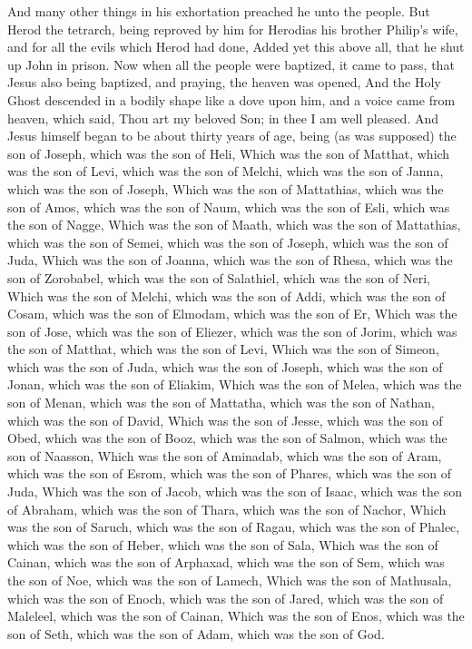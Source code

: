  And many other things in his exhortation preached he
unto the people.  But Herod the tetrarch, being reproved
by him for Herodias his brother Philip's wife, and for all the evils
which Herod had done,  Added yet this above all, that he
shut up John in prison.  Now when all the people were
baptized, it came to pass, that Jesus also being baptized, and praying,
the heaven was opened,  And the Holy Ghost descended in a
bodily shape like a dove upon him, and a voice came from heaven, which
said, Thou art my beloved Son; in thee I am well pleased.
 And Jesus himself began to be about thirty years of age,
being (as was supposed) the son of Joseph, which was the son of Heli,
 Which was the son of Matthat, which was the son of Levi,
which was the son of Melchi, which was the son of Janna, which was the
son of Joseph,  Which was the son of Mattathias, which
was the son of Amos, which was the son of Naum, which was the son of
Esli, which was the son of Nagge,  Which was the son of
Maath, which was the son of Mattathias, which was the son of Semei,
which was the son of Joseph, which was the son of Juda, 
Which was the son of Joanna, which was the son of Rhesa, which was the
son of Zorobabel, which was the son of Salathiel, which was the son of
Neri,  Which was the son of Melchi, which was the son of
Addi, which was the son of Cosam, which was the son of Elmodam, which
was the son of Er,  Which was the son of Jose, which was
the son of Eliezer, which was the son of Jorim, which was the son of
Matthat, which was the son of Levi,  Which was the son of
Simeon, which was the son of Juda, which was the son of Joseph, which
was the son of Jonan, which was the son of Eliakim, 
Which was the son of Melea, which was the son of Menan, which was the
son of Mattatha, which was the son of Nathan, which was the son of
David,  Which was the son of Jesse, which was the son of
Obed, which was the son of Booz, which was the son of Salmon, which was
the son of Naasson,  Which was the son of Aminadab, which
was the son of Aram, which was the son of Esrom, which was the son of
Phares, which was the son of Juda,  Which was the son of
Jacob, which was the son of Isaac, which was the son of Abraham, which
was the son of Thara, which was the son of Nachor,  Which
was the son of Saruch, which was the son of Ragau, which was the son of
Phalec, which was the son of Heber, which was the son of Sala,
 Which was the son of Cainan, which was the son of
Arphaxad, which was the son of Sem, which was the son of Noe, which was
the son of Lamech,  Which was the son of Mathusala, which
was the son of Enoch, which was the son of Jared, which was the son of
Maleleel, which was the son of Cainan,  Which was the son
of Enos, which was the son of Seth, which was the son of Adam, which was
the son of God.

